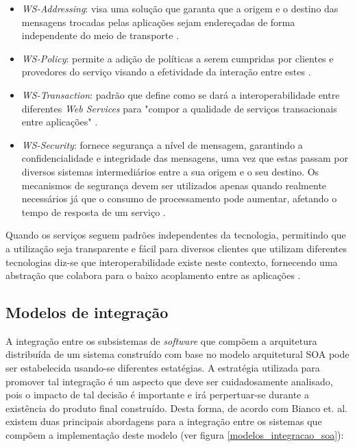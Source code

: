 \begin{itemize}
\item \textit{WS-Addressing}: visa uma solução que garanta que a origem e o destino das mensagens trocadas pelas aplicações sejam endereçadas de forma independente do meio de transporte \cite{oliveira_interoperabilidade}.
\item \textit{WS-Policy}: permite a adição de políticas a serem cumpridas por clientes e provedores do serviço visando a efetividade da interação entre estes \cite{oliveira_interoperabilidade}.
\item \textit{WS-Transaction}: padrão que define como se dará a interoperabilidade entre diferentes \textit{Web Services} para "compor a qualidade de serviços transacionais entre aplicações" \cite{oliveira_interoperabilidade}.
\item \textit{WS-Security}: fornece segurança a nível de mensagem, garantindo a confidencialidade e integridade das mensagens, uma vez que estas passam por diversos sistemas intermediários entre a sua origem e o seu destino. Os mecanismos de segurança devem ser utilizados apenas quando realmente necessários já que o consumo de processamento pode aumentar, afetando o tempo de resposta de um serviço \cite{oliveira_interoperabilidade}.
\end{itemize}

Quando os serviços seguem padrões independentes da tecnologia, permitindo que a utilização seja transparente e fácil para diversos clientes que utilizam diferentes tecnologias diz-se que interoperabilidade existe neste contexto, fornecendo uma abstração que colabora para o baixo acoplamento entre as aplicações \cite{oliveira_interoperabilidade}.

\subsection{Modelos de integração}
A integração entre os subsistemas de \textit{software} que compõem a arquitetura distribuída de um sistema construído com base no modelo arquitetural SOA pode ser estabelecida usando-se diferentes estatégias. A estratégia utilizada para promover tal integração é um aspecto que deve ser cuidadosamente analisado, pois o impacto de tal decisão é importante e irá perpertuar-se durante a existência do produto final construído. Desta forma, de acordo com Bianco et. al. \cite{Bianco2007} existem duas principais abordagens para a integração entre os sistemas que compõem a implementação deste modelo (ver figura \ref{modelos_integracao_soa}):

